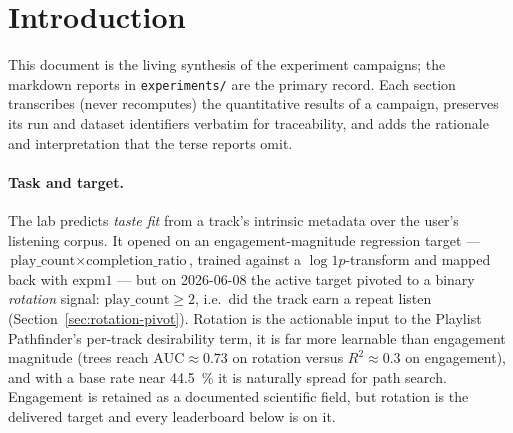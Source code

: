 \documentclass[11pt]{article}
\newcommand{\rsq}{$R^2$}
\begin{document}
\begin{abstract}
lifts the net into the in-dataset tree tier (AUC \num{0.7192}, within $\sim$1
band of \texttt{catboost}), the first ANN to clear the rotation save bar, saved
as \texttt{burn-deep-embeddings-highvocab}. An eighth campaign then probes the inverse lever and refutes it: the classic Facebook GBDT$\to$LR trick generalized to GBDT$\to$MLP --- training a fresh head on the frozen champion tree's one-hot leaf indices --- caps \num{1.8}--\num{2.4} noise bands \emph{below} the bare xgboost champion (best head AUC \num{0.6978}) with badly broken calibration, a seventh convergent confirmation that learned representations layered on the trees do not help. A ninth campaign then probes how far the standing identity-resolution lever can go: a vocab-cap scan on the bare GBDT, holding the frozen champion config and moving \emph{only} the artist/genre one-hot cardinality, finds the lever \emph{largely spent} --- the first jump ($60/40\to300/120$) carries the gain, and past 300/120 each step pays only sub-band returns; xgboost reaches a new in-lineage single-split best AUC \num{0.7349} at 1000/300 (only $+0.005$, $\sim$0.4 band, over the anchor --- no save fired), \texttt{catboost} tracks it, and the full-vocabulary point could not be built (host memory ceiling). Section~\ref{sec:anns} consolidates
why artificial neural nets structurally underperform on this one-hot-heavy
feature matrix, how the representation-aware net resolves the diagnosis, and how
enough identity resolution finally lets the embedding topology pay off.
\end{abstract}

\section{Introduction}
This document is the living synthesis of the experiment campaigns; the
markdown reports in \texttt{experiments/} are the primary record. Each section
transcribes (never recomputes) the quantitative results of a campaign,
preserves its run and dataset identifiers verbatim for traceability, and adds
the rationale and interpretation that the terse reports omit.

\paragraph{Task and target.} The lab predicts \emph{taste fit} from a track's
intrinsic metadata over the user's listening corpus. It opened on an
engagement-magnitude regression target ---
$\text{play\_count}\times\text{completion\_ratio}$, trained against a
$\log1p$-transform and mapped back with $\text{expm1}$ --- but on 2026-06-08
the active target pivoted to a binary \emph{rotation} signal:
$\text{play\_count}\ge 2$, i.e.\ did the track earn a repeat listen
(Section~\ref{sec:rotation-pivot}). Rotation is the actionable input to the
Playlist Pathfinder's per-track desirability term, it is far more learnable
than engagement magnitude (trees reach $\text{AUC}\approx 0.73$ on rotation
versus \rsq{}$\approx 0.3$ on engagement), and with a base rate near
\SI{44.5}{\percent} it is naturally spread for path search. Engagement is
retained as a documented scientific field, but rotation is the delivered
target and every leaderboard below is on it.
\end{document}

